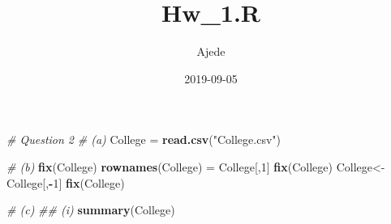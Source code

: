 \documentclass[]{article}
\title{Hw\_1.R}
\author{Ajede}
\date{2019-09-05}
\newenvironment{Shaded}{\begin{snugshade}}{\end{snugshade}}
\newcommand{\CommentTok}[1]{\textcolor[rgb]{0.56,0.35,0.01}{\textit{#1}}}
\newcommand{\DecValTok}[1]{\textcolor[rgb]{0.00,0.00,0.81}{#1}}
\newcommand{\KeywordTok}[1]{\textcolor[rgb]{0.13,0.29,0.53}{\textbf{#1}}}
\newcommand{\NormalTok}[1]{#1}
\newcommand{\OperatorTok}[1]{\textcolor[rgb]{0.81,0.36,0.00}{\textbf{#1}}}
\newcommand{\StringTok}[1]{\textcolor[rgb]{0.31,0.60,0.02}{#1}}
\begin{document}
\maketitle

\begin{Shaded}
\begin{Highlighting}[]
\CommentTok{# Question 2}
\CommentTok{# (a)}
\NormalTok{College =}\StringTok{ }\KeywordTok{read.csv}\NormalTok{(}\StringTok{"College.csv"}\NormalTok{)}

\CommentTok{# (b)}
\KeywordTok{fix}\NormalTok{(College)}
\KeywordTok{rownames}\NormalTok{(College) =}\StringTok{ }\NormalTok{College[,}\DecValTok{1}\NormalTok{]}
\KeywordTok{fix}\NormalTok{(College)}
\NormalTok{College<-}\StringTok{ }\NormalTok{College[,}\OperatorTok{-}\DecValTok{1}\NormalTok{]}
\KeywordTok{fix}\NormalTok{(College)}

\CommentTok{# (c)}
\CommentTok{## (i)}
\KeywordTok{summary}\NormalTok{(College)}
\end{Highlighting}
\end{Shaded}
\end{document}
